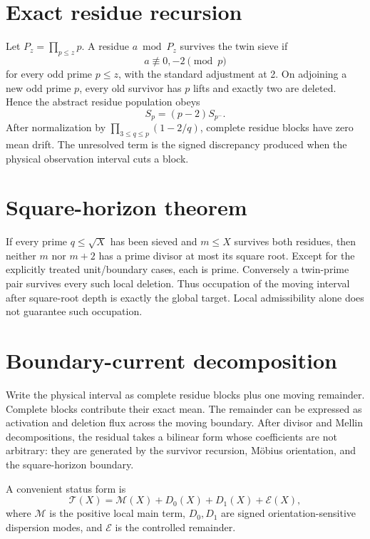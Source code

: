 \documentclass[11pt,a4paper]{article}
\begin{document}
\section{Exact residue recursion}
Let $P_z=\prod_{p\le z}p$. A residue $a\bmod P_z$ survives the twin sieve if
\begin{equation}
a\not\equiv0,-2\pmod p
\end{equation}
for every odd prime $p\le z$, with the standard adjustment at 2. On adjoining a new odd prime $p$, every old survivor has $p$ lifts and exactly two are deleted. Hence the abstract residue population obeys
\begin{equation}
S_p=(p-2)S_{p^-}.
\end{equation}
After normalization by $\prod_{3\le q\le p}(1-2/q)$, complete residue blocks have zero mean drift. The unresolved term is the signed discrepancy produced when the physical observation interval cuts a block.

\section{Square-horizon theorem}
If every prime $q\le\sqrt X$ has been sieved and $m\le X$ survives both residues, then neither $m$ nor $m+2$ has a prime divisor at most its square root. Except for the explicitly treated unit/boundary cases, each is prime. Conversely a twin-prime pair survives every such local deletion. Thus occupation of the moving interval after square-root depth is exactly the global target. Local admissibility alone does not guarantee such occupation.

\section{Boundary-current decomposition}
Write the physical interval as complete residue blocks plus one moving remainder. Complete blocks contribute their exact mean. The remainder can be expressed as activation and deletion flux across the moving boundary. After divisor and Mellin decompositions, the residual takes a bilinear form whose coefficients are not arbitrary: they are generated by the survivor recursion, M\"obius orientation, and the square-horizon boundary.

A convenient status form is
\begin{equation}
\mathcal T(X)=\mathcal M(X)+D_0(X)+D_1(X)+\mathcal E(X),
\end{equation}
where $\mathcal M$ is the positive local main term, $D_0,D_1$ are signed orientation-sensitive dispersion modes, and $\mathcal E$ is the controlled remainder.
\end{document}
